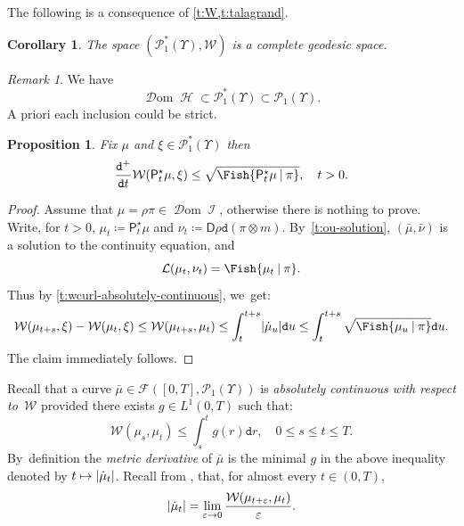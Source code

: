 \documentclass[JEP,XML,SOM,Unicode,published]{cedram}
\newcommand\mto{\mathchoice{\longmapsto}{\mapsto}{\mapsto}{\mapsto}}
\newtheorem{proposition}[theorem]{Proposition}
\newtheorem{corollary}[theorem]{Corollary}
\theoremstyle{definition}
\theoremstyle{remark}
\newtheorem{remark}[theorem]{Remark}
\DeclarePairedDelimiter{\abs}{\lvert}{\rvert}
\newcommand{\given}[1][]{%
\nonscript\:#1\vert
\allowbreak
\nonscript\:
\mathopen{}}
\DeclareMathOperator{\ent}{\mathcal{H}}
\DeclareMathOperator{\fish}{\mathcal{I}}
\DeclareMathOperator{\dom}{\mathscr{D}om}
\begin{document}
The following is a consequence of \cref{t:W,t:talagrand}.
\begin{corollary}\label{t:p1-complete-geodesic}
The space $(\mathscr{P}_{1}^{*}(\varUpsilon), \mathcal{W})$ is a complete geodesic space.
\end{corollary}

\begin{remark}
We have
\begin{equation*}
\dom \ent \subset \mathscr{P}_{1}^{*}(\varUpsilon) \subset \mathscr{P}_{1}(\varUpsilon).
\end{equation*}
A priori each inclusion could be strict.
\end{remark}

\begin{proposition}\label{t:wcurl-derivative-fisher}
Fix $\mu$ and $\xi \in \mathscr{P}^{*}_{1}(\varUpsilon)$ then
\begin{equation*}
\frac{\mathtt{d}^{+}}{\mathtt{d} t} \mathcal{W}(\mathsf{P}^{\star}_{t}\mu, \xi) \leq \sqrt{\Fish{ \mathsf{P}^{\star}_{t} \mu \given \pi }}, \quad t > 0.
\end{equation*}
\end{proposition}
\begin{proof}
Assume that $\mu = \rho \pi \in \dom \fish$, otherwise there is nothing to prove.
Write, for $t > 0$, $\mu_{t} \coloneq \mathsf{P}^{\star}_{t} \mu$ and $\nu_{t} \coloneq \mathsf{D} \rho \mathtt{d}(\pi \otimes m)$.
By~\cref{t:ou-solution}, $(\bar{\mu}, \bar{\nu})$ is a solution to the continuity equation, and
\begin{equation*}
\mathcal{L}(\mu_{t}, \nu_{t}) = \Fish{ \mu_{t} \given \pi }.
\end{equation*}
Thus by \cref{t:wcurl-absolutely-continuous}, we~get:
\begin{equation*}
\mathcal{W}(\mu_{t+s}, \xi) - \mathcal{W}(\mu_{t}, \xi) \leq \mathcal{W}(\mu_{t+s}, \mu_{t}) \leq \int_{t}^{t+s} \abs{\dot{\mu}_{u}} \mathtt{d} u \leq \int_{t}^{t+s} \sqrt{\Fish{ \mu_{u} \given \pi }} \mathtt{d} u.
\end{equation*}
The claim immediately follows.
\end{proof}

Recall that a curve $\bar{\mu} \in \mathscr{F}([0,T], \mathscr{P}_{1}(\varUpsilon))$ is \emph{absolutely continuous with respect to~$\mathcal{W}$} provided there exists $g \in L^{1}(0,T)$ such that:
\begin{equation*}
\mathcal{W}(\mu_{s}, \mu_{t}) \leq \int_{s}^{t} g(r) \mathtt{d} r, \quad 0 \leq s \leq t \leq T.
\end{equation*}
By~definition the \emph{metric derivative} of $\bar{\mu}$ is the minimal $g$ in the above inequality denoted by $t \mto \abs{\dot{\mu}_{t}}$.
Recall from \cite[Th.\,1.1.2]{AGS}, that, for almost every $t \in (0,T)$,
\begin{equation*}
\abs{\dot{\mu}_{t}} = \lim_{\varepsilon \to 0} \frac{\mathcal{W}(\mu_{t + \varepsilon}, \mu_{t})}{\varepsilon}.
\end{equation*}
\end{document}
